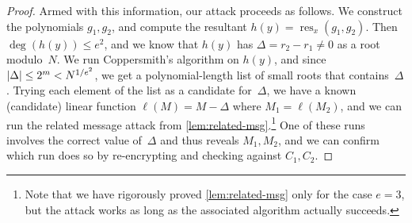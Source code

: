 \documentclass[11pt]{article}
\DeclareMathOperator{\res}{res}
\begin{document}
\begin{proof}
  Armed with this information, our attack proceeds as follows. We
  construct the polynomials $g_1, g_2$, and compute the resultant
  $h(y)=\res_x(g_1,g_2)$. Then $\deg(h(y)) \leq e^2$, and we know that
  $h(y)$ has $\Delta=r_2-r_1 \neq 0$ as a root modulo~$N$. We run
  Coppersmith's algorithm on $h(y)$, and since
  $\lvert\Delta\rvert \leq 2^{m} < N^{1/e^2}$, we get a polynomial-length
  list of small roots that contains~$\Delta$. Trying each element of
  the list as a candidate for~$\Delta$, we have a known (candidate)
  linear function $\ell(M) = M - \Delta$ where
  $M_{1} = \ell(M_{2})$, and we can run the related message attack
  from \cref{lem:related-msg}.\footnote{Note that we have rigorously
    proved \cref{lem:related-msg} only for the case $e=3$, but the
    attack works as long as the associated algorithm actually
    succeeds.} One of these runs involves the correct value
  of~$\Delta$ and thus reveals $M_{1}, M_{2}$, and we can confirm
  which run does so by re-encrypting and checking against
  $C_{1}, C_{2}$.
\end{proof}
\end{document}

